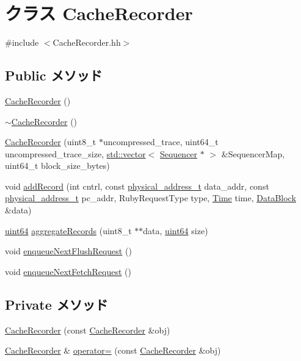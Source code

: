 \hypertarget{classCacheRecorder}{
\section{クラス CacheRecorder}
\label{classCacheRecorder}
}


{\ttfamily \#include $<$CacheRecorder.hh$>$}\subsection*{Public メソッド}
\begin{DoxyCompactItemize}
\item 
\hyperlink{classCacheRecorder_aa673c9e5d414051444f039a905c2ae23}{CacheRecorder} ()
\item 
\hyperlink{classCacheRecorder_a68f3dcf17846371633e1febffe1d9f59}{$\sim$CacheRecorder} ()
\item 
\hyperlink{classCacheRecorder_a4f7b56431467eb96301939488f742090}{CacheRecorder} (uint8\_\-t $\ast$uncompressed\_\-trace, uint64\_\-t uncompressed\_\-trace\_\-size, \hyperlink{classstd_1_1vector}{std::vector}$<$ \hyperlink{classSequencer}{Sequencer} $\ast$ $>$ \&SequencerMap, uint64\_\-t block\_\-size\_\-bytes)
\item 
void \hyperlink{classCacheRecorder_ae272072fe83d29085b21b133b1c9cd68}{addRecord} (int cntrl, const \hyperlink{TypeDefines_8hh_a7901e1a365850c5ff38ec6e12b6b9ffc}{physical\_\-address\_\-t} data\_\-addr, const \hyperlink{TypeDefines_8hh_a7901e1a365850c5ff38ec6e12b6b9ffc}{physical\_\-address\_\-t} pc\_\-addr, RubyRequestType type, \hyperlink{classTime}{Time} time, \hyperlink{classDataBlock}{DataBlock} \&data)
\item 
\hyperlink{TypeDefines_8hh_a29940ae63ec06c9998bba873e25407ad}{uint64} \hyperlink{classCacheRecorder_a6ae226d7f41b789f69be6b38862f9f60}{aggregateRecords} (uint8\_\-t $\ast$$\ast$data, \hyperlink{TypeDefines_8hh_a29940ae63ec06c9998bba873e25407ad}{uint64} size)
\item 
void \hyperlink{classCacheRecorder_a919f5c212476d98932496ef3327cf4e6}{enqueueNextFlushRequest} ()
\item 
void \hyperlink{classCacheRecorder_add70752975809e80cb192a2826b97087}{enqueueNextFetchRequest} ()
\end{DoxyCompactItemize}
\subsection*{Private メソッド}
\begin{DoxyCompactItemize}
\item 
\hyperlink{classCacheRecorder_af47a811c6378316ead000ba30b045f1d}{CacheRecorder} (const \hyperlink{classCacheRecorder}{CacheRecorder} \&obj)
\item 
\hyperlink{classCacheRecorder}{CacheRecorder} \& \hyperlink{classCacheRecorder_a91200370312dc9051e23bd44afafd41f}{operator=} (const \hyperlink{classCacheRecorder}{CacheRecorder} \&obj)
\end{DoxyCompactItemize}
